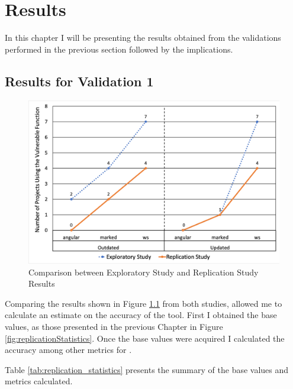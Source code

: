 \chapter{Results}
\label{sec:results}

In this chapter I will be presenting the results obtained from the validations performed in the previous section followed by the implications.

\section{Results for Validation 1}
\begin{figure}[ht]
\centering
\includegraphics[width=1\textwidth]{images/studies_comp_graph3.png}
\caption{Comparison between Exploratory Study and Replication Study Results}
\label{fig:replicationResults}
\end{figure}
Comparing the results shown in Figure \ref{fig:replicationResults} from both studies, allowed me to calculate an estimate on the accuracy of the tool. First I obtained the base values, as those presented in the previous Chapter in Figure \ref{fig:replicationStatistics}. Once the base values were acquired I calculated the accuracy among other metrics for \tool[]. 

Table \ref{tab:replication_statistics} presents the summary of the base values and metrics calculated.

